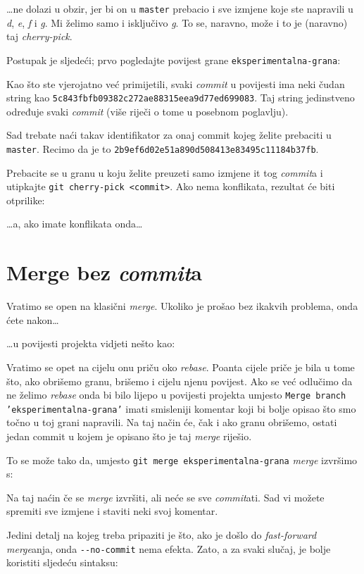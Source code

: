 

\dots{}ne dolazi u obzir, jer bi on u \verb+master+ prebacio i sve izmjene koje ste napravili u \emph d, \emph e, \emph f i \emph g.
Mi želimo samo i isključivo \emph g.
To se, naravno, može i to je (naravno) taj \emph{cherry-pick}.

Postupak je sljedeći; prvo pogledajte povijest grane \verb+eksperimentalna-grana+:



Kao što ste vjerojatno već primijetili, svaki \emph{commit} u povijesti ima neki čudan string kao \verb+5c843fbfb09382c272ae88315eea9d77ed699083+.
Taj string jedinstveno određuje svaki \emph{commit} (više riječi o tome u posebnom poglavlju).

Sad trebate naći takav identifikator za onaj commit kojeg želite prebaciti u \verb+master+. Recimo da je to \verb+2b9ef6d02e51a890d508413e83495c11184b37fb+.

Prebacite se u granu u koju želite preuzeti samo izmjene it tog \emph{commit}a i utipkajte \verb+git cherry-pick <commit>+.
Ako nema konflikata, rezultat će biti otprilike:



\dots{}a, ako imate konflikata onda\dots

\section*{Merge bez \emph{commit}a}

Vratimo se open na klasični \emph{merge}.
Ukoliko je prošao bez ikakvih problema, onda ćete nakon\dots



\dots{}u povijesti projekta vidjeti nešto kao:



Vratimo se opet na cijelu onu priču oko \emph{rebase}.
Poanta cijele priče je bila u tome što, ako obrišemo granu, brišemo i cijelu njenu povijest.
Ako se već odlučimo da ne želimo \emph{rebase} onda bi bilo lijepo u povijesti projekta umjesto \texttt{Merge branch 'eksperimentalna-grana'} imati smisleniji komentar koji bi bolje opisao što smo točno u toj grani napravili.
Na taj način će, čak i ako granu obrišemo, ostati jedan commit u kojem je opisano što je taj \emph{merge} riješio.

To se može tako da, umjesto \verb+git merge eksperimentalna-grana+ \emph{merge} izvršimo s:


Na taj naćin če se \emph{merge} izvršiti, ali neće se sve \emph{commit}ati. 
Sad vi možete spremiti sve izmjene i staviti neki svoj komentar.

Jedini detalj na kojeg treba pripaziti je što, ako je došlo do \emph{fast-forward} \emph{merge}anja, onda \verb+--no-commit+ nema efekta.
Zato, a za svaki slučaj, je bolje koristiti sljedeću sintaksu:

